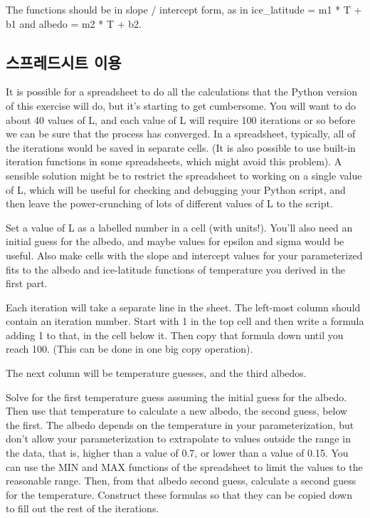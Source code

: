 {The functions should be in slope / intercept form, as in ice_latitude = m1 * T + b1 and albedo = m2 * T + b2.

\subsection{스프레드시트 이용}\index{}
It is possible for a spreadsheet to do all the calculations that the Python version of this exercise will do, but it's starting to get cumbersome. You will want to do about 40 values of L, and each value of L will require 100 iterations or so before we can be sure that the process has converged. In a spreadsheet, typically, all of the iterations would be saved in separate cells. (It is also possible to use built-in iteration functions in some spreadsheets, which might avoid this problem). A sensible solution might be to restrict the spreadsheet to working on a single value of L, which will be useful for checking and debugging your Python script, and then leave the power-crunching of lots of different values of L to the script.

Set a value of L as a labelled number in a cell (with units!). You'll also need an initial guess for the albedo, and maybe values for epsilon and sigma would be useful. Also make cells with the slope and intercept values for your parameterized fits to the albedo and ice-latitude functions of temperature you derived in the first part.

Each iteration will take a separate line in the sheet. The left-most column should contain an iteration number. Start with 1 in the top cell and then write a formula adding 1 to that, in the cell below it. Then copy that formula down until you reach 100. (This can be done in one big copy operation).

The next column will be temperature guesses, and the third albedos.

Solve for the first temperature guess assuming the initial guess for the albedo. Then use that temperature to calculate a new albedo, the second guess, below the first. The albedo depends on the temperature in your parameterization, but don’t allow your parameterization to extrapolate to values outside the range in the data, that is, higher than a value of 0.7, or lower than a value of 0.15. You can use the MIN and MAX functions of the spreadsheet to limit the values to the reasonable range. Then, from that albedo second guess, calculate a second guess for the temperature. Construct these formulas so that they can be copied down to fill out the rest of the iterations.

}
